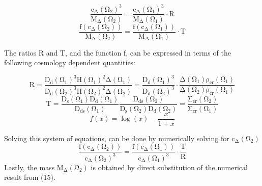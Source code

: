 \begin{equation}
\mathrm{\frac{c_{\Delta}(\Omega_{2})^{3}}{M_{\Delta}(\Omega_{2})} =
  \frac{c_{\Delta}(\Omega_{1})^{3}}{M_{\Delta}(\Omega_{1})} \cdot R }
\end{equation}
\begin{equation}
\mathrm{\frac{f(c_{\Delta}(\Omega_{2}))}{M_{\Delta}(\Omega_{2})} =
  \frac{f(c_{\Delta}(\Omega_{1}))}{M_{\Delta}(\Omega_{1})} \cdot T }
\end{equation}

The ratios $\mathrm{R}$ and $\mathrm{T}$, and the function $\mathrm{f}$, can be
expressed in terms of the following cosmology dependent quantities:

\begin{equation}
\mathrm{R = \frac{D_{d}(\Omega_{1})^{3} H(\Omega_{1})^{2} \Delta
    (\Omega_{1})}{D_{d}(\Omega_{2})^{3} H(\Omega_{2})^{2} \Delta (\Omega_{2})}
  = \frac{D_{d}(\Omega_{1})^{3}}{D_{d}(\Omega_{2})^{3}} \cdot \frac{\Delta
    (\Omega_{1}) \rho_{cr}(\Omega_{1})}{ \Delta
    (\Omega_{2}) \rho_{cr}(\Omega_{1})} }
\end{equation}
\begin{equation}
\mathrm{T = \frac{D_{s}(\Omega_{1}) D_{d}(\Omega_{1})}{D_{ds}(\Omega_{1})}
  \frac{D_{ds}(\Omega_{2})}{D_{s}(\Omega_{2}) D_{d}(\Omega_{2})} =
  \frac{\Sigma_{cr}(\Omega_{2})}{\Sigma_{cr}(\Omega_{1})}}
\end{equation}
\begin{equation}
f(x) = \log(x) - \frac{x}{1+x}
\end{equation}

Solving this system of equations, can be done by numerically solving for
$\mathrm{c_{\Delta}(\Omega_{2})}$
\begin{equation} 
\mathrm{\frac{f(c_{\Delta}(\Omega_{2}))}{c_{\Delta}(\Omega_{2})^{3}} =
  \frac{f(c_{\Delta}(\Omega_{1}))}{c_{\Delta}(\Omega_{1})^{3}} \cdot \frac{T}{R} }
\end{equation}
Lastly, the mass $\mathrm{M_{\Delta}(\Omega_{2})}$ is obtained by direct
substitution of the numerical result from (15). 



